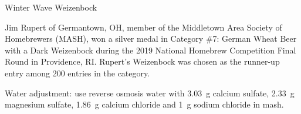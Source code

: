 \stylesection{\styleweizenbock}

\begin{recipe}{Winter Wave Weizenbock}

\begin{aboutblock}
Jim Rupert of Germantown, OH, member of the Middletown Area Society of Homebrewers
(MASH), won a silver medal in Category \#7: German Wheat Beer with a Dark Weizenbock
during the 2019 National Homebrew Competition Final Round in Providence, RI.
Rupert's Weizenbock was chosen as the runner-up entry among 200 entries in the
category. \sourceaha
\end{aboutblock}


\begin{methodandtiming}
 
\begin{mashsteps}
\end{mashsteps}

\begin{directions}
Water adjustment: use reverse osmosis water with 3.03~g calcium sulfate, 2.33~g
magnesium sulfate, 1.86~g calcium chloride and 1~g sodium chloride in mash.
\end{directions}

\end{methodandtiming}

\recipebreak

\begin{ingredientsblock}

\begin{malts}
\end{malts}

\begin{hops}
\end{hops}


\end{ingredientsblock}

\end{recipe}
